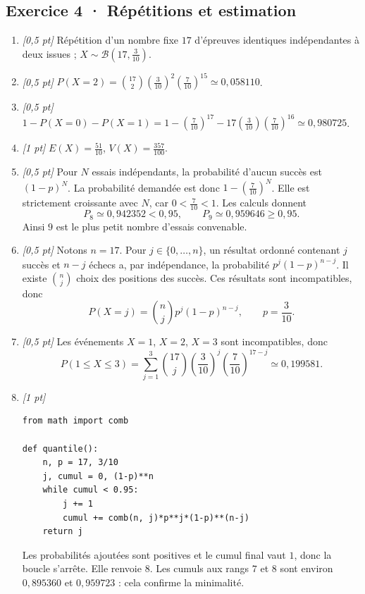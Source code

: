 \subsection*{Exercice 4 · Répétitions et estimation}\begin{enumerate}

\item \textit{[0,5 pt]} Répétition d'un nombre fixe $17$ d'épreuves identiques indépendantes à deux issues ; $X\sim\mathcal B(17,\frac{3}{10})$.

\item \textit{[0,5 pt]} $P(X=2)=\binom{17}2(\frac{3}{10})^2(\frac{7}{10})^{15}\simeq0{,}058110$.

\item \textit{[0,5 pt]} $1-P(X=0)-P(X=1)=1-(\frac{7}{10})^{17}-17(\frac{3}{10})(\frac{7}{10})^{16}\simeq0{,}980725$.

\item \textit{[1 pt]} $E(X)=\frac{51}{10}$, $V(X)=\frac{357}{100}$.

\item \textit{[0,5 pt]} Pour $N$ essais indépendants, la probabilité d'aucun succès est $(1-p)^N$. La probabilité demandée est donc $1-(\frac{7}{10})^N$. Elle est strictement croissante avec $N$, car $0<\frac{7}{10}<1$. Les calculs donnent
\[P_{8}\simeq0{,}942352<0{,}95,\qquad P_{9}\simeq0{,}959646\ge0{,}95.\]
Ainsi $9$ est le plus petit nombre d'essais convenable.

\item \textit{[0,5 pt]} Notons $n=17$. Pour $j\in\{0,\ldots,n\}$, un résultat ordonné contenant $j$ succès et $n-j$ échecs a, par indépendance, la probabilité $p^j(1-p)^{n-j}$. Il existe $\binom nj$ choix des positions des succès. Ces résultats sont incompatibles, donc
\[P(X=j)=\binom nj p^j(1-p)^{n-j},\qquad p=\frac{3}{10}.\]

\item \textit{[0,5 pt]} Les événements $X=1$, $X=2$, $X=3$ sont incompatibles, donc
\[P(1\le X\le3)=\sum_{j=1}^3\binom{17}j(\frac{3}{10})^j(\frac{7}{10})^{17-j}\simeq0{,}199581.\]


\item \textit{[1 pt]} 
\begin{lstlisting}
from math import comb

def quantile():
    n, p = 17, 3/10
    j, cumul = 0, (1-p)**n
    while cumul < 0.95:
        j += 1
        cumul += comb(n, j)*p**j*(1-p)**(n-j)
    return j
\end{lstlisting}
Les probabilités ajoutées sont positives et le cumul final vaut $1$, donc la boucle s'arrête. Elle renvoie $8$. Les cumuls aux rangs $7$ et $8$ sont environ $0{,}895360$ et $0{,}959723$ : cela confirme la minimalité.

\end{enumerate}

